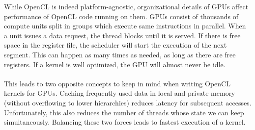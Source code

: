 While OpenCL is indeed platform-agnostic, organizational details of GPUs affect performance of OpenCL code running on them. GPUs consist of thousands of compute units split in groups which execute same instructions in parallel. When a unit issues a data request, the thread blocks until it is served. If there is free space in the register file, the scheduler will start the execution of the next segment. This can happen as many times as needed, as long as there are free registers. If a kernel is well optimized, the GPU will almost never be idle.\\
\\
This leads to two opposite concepts to keep in mind when writing OpenCL kernels for GPUs. Caching frequently used data in local and private memory (without overflowing to lower hierarchies) reduces latency for subsequent accesses. Unfortunately, this also reduces the number of threads whose state we can keep simultaneously. Balancing these two forces leads to fastest execution of a kernel.\\
